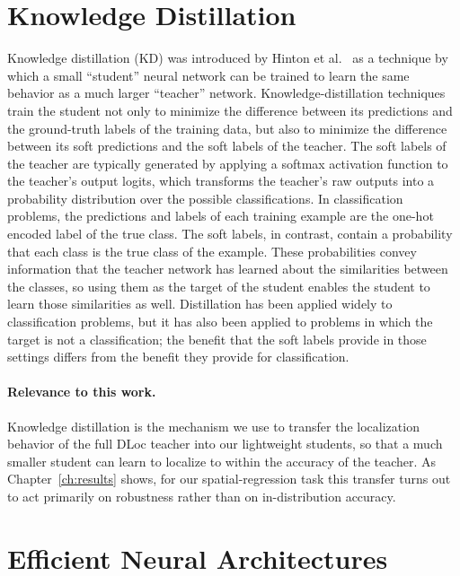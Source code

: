 \section{Knowledge Distillation}
\label{sec:lit:distillation}

Knowledge distillation (KD) was introduced by Hinton et al.~\cite{hinton2015distilling} as a technique
by which a small ``student'' neural network can be trained to learn the same behavior as a much larger
``teacher'' network. Knowledge-distillation techniques train the student not only to minimize the
difference between its predictions and the ground-truth labels of the training data, but also to
minimize the difference between its soft predictions and the soft labels of the teacher. The soft labels
of the teacher are typically generated by applying a softmax activation function to the teacher's output
logits, which transforms the teacher's raw outputs into a probability distribution over the possible
classifications. In classification problems, the predictions and labels of each training example are the
one-hot encoded label of the true class. The soft labels, in contrast, contain a probability that each
class is the true class of the example. These probabilities convey information that the teacher network
has learned about the similarities between the classes, so using them as the target of the student
enables the student to learn those similarities as well. Distillation has been applied widely to
classification problems, but it has also been applied to problems in which the target is not a
classification; the benefit that the soft labels provide in those settings differs from the benefit they
provide for classification.

\paragraph{Relevance to this work.} Knowledge distillation is the mechanism we use to transfer the
localization behavior of the full DLoc teacher into our lightweight students, so that a much smaller
student can learn to localize to within the accuracy of the teacher. As Chapter~\ref{ch:results} shows,
for our spatial-regression task this transfer turns out to act primarily on robustness rather than on
in-distribution accuracy.

\section{Efficient Neural Architectures}
\label{sec:lit:architectures}

